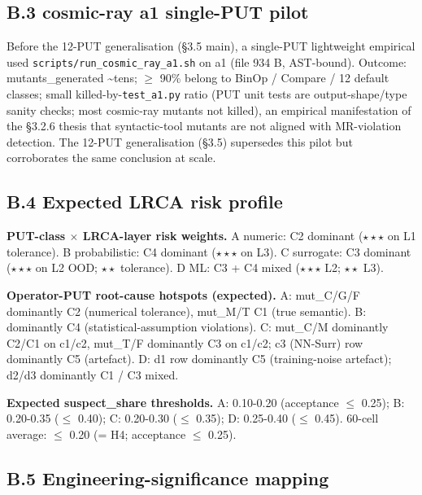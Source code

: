 \documentclass[acmsmall,screen,review]{acmart}
\begin{document}
\subsection{B.3 cosmic-ray a1 single-PUT pilot}\label{b.3-cosmic-ray-a1-single-put-pilot-pre-12-put-empirical}

Before the 12-PUT generalisation (§3.5 main), a single-PUT lightweight
empirical used \texttt{scripts/run\_cosmic\_ray\_a1.sh} on a1 (file
934 B, AST-bound). Outcome: mutants\_generated \textasciitilde tens; $\geq$
90\% belong to BinOp / Compare / 12 default classes; small
killed-by-\texttt{test\_a1.py} ratio (PUT unit tests are
output-shape/type sanity checks; most cosmic-ray mutants not killed), an
empirical manifestation of the §3.2.6 thesis that syntactic-tool mutants
are not aligned with MR-violation detection. The 12-PUT generalisation
(§3.5) supersedes this pilot but corroborates the same conclusion at
scale.

\subsection{B.4 Expected LRCA risk profile}\label{b.4-expected-lrca-risk-profile}

\textbf{PUT-class $\times$ LRCA-layer risk weights.} A numeric: C2 dominant
($\star\star\star$ on L1 tolerance). B probabilistic: C4 dominant ($\star\star\star$ on L3). C
surrogate: C3 dominant ($\star\star\star$ on L2 OOD; $\star\star$ tolerance). D ML: C3 + C4
mixed ($\star\star\star$ L2; $\star\star$ L3).

\textbf{Operator-PUT root-cause hotspots (expected).} A: mut\_C/G/F
dominantly C2 (numerical tolerance), mut\_M/T C1 (true semantic). B:
dominantly C4 (statistical-assumption violations). C: mut\_C/M
dominantly C2/C1 on c1/c2, mut\_T/F dominantly C3 on c1/c2; c3 (NN-Surr)
row dominantly C5 (artefact). D: d1 row dominantly C5 (training-noise
artefact); d2/d3 dominantly C1 / C3 mixed.

\textbf{Expected suspect\_share thresholds.} A: 0.10-0.20 (acceptance $\leq$
0.25); B: 0.20-0.35 ($\leq$ 0.40); C: 0.20-0.30 ($\leq$ 0.35); D: 0.25-0.40 ($\leq$
0.45). 60-cell average: $\leq$ 0.20 (= H4; acceptance $\leq$ 0.25).

\subsection{B.5 Engineering-significance mapping}\label{b.5-engineering-significance-mapping}
\end{document}
